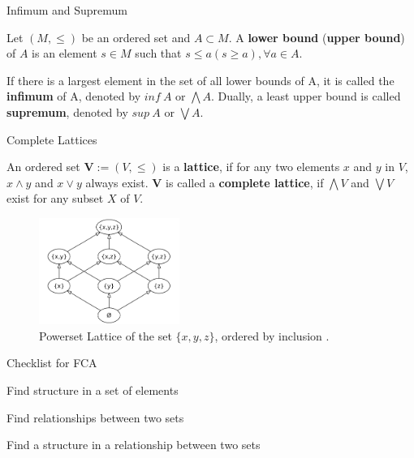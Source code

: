 \documentclass[pdf,xcolor=table]{beamer}
\newcommand{\cmark}{\ding{51}}%
\newcommand{\done}{\rlap{$\square$}{\raisebox{2pt}{\large\hspace{1pt}\cmark}}%
\hspace{-2.5pt}}
\begin{document}
\begin{frame}[t]{Infimum and Supremum}
    \begin{definition}
        Let $(M, \leq)$ be an ordered set and $A \subset M$. A \textbf{lower bound} (\textbf{upper bound}) of $A$ is an element $s \in M$ such that $s \leq a (s \geq a), \forall a \in A$.
    \end{definition}
    \begin{definition}
        If there is a largest element in the set of all lower bounds of A, it is called the \textbf{infimum} of A, denoted by $inf\ A$ or $\bigwedge A$. Dually, a least upper bound is called \textbf{supremum}, denoted by $sup\ A$ or $\bigvee A$.
    \end{definition}
\end{frame}

\begin{frame}[t]{Complete Lattices}
    \begin{definition}
        An ordered set $\textbf{V} := (V, \leq)$ is a \textbf{lattice}, if for any two elements $x$ and $y$ in $V$, $x \wedge y$ and $x \vee y$ always exist.
        \textbf{V} is called a \textbf{complete lattice}, if $\bigwedge V$ and $\bigvee V$ exist for any subset $X$ of $V$.
    \end{definition}
    \begin{figure}
        \centering
        \includegraphics[width=130pt]{Hasse_diagram_of_powerset_of_3.png}
        \caption{Powerset Lattice of the set $\{x, y, z\}$, ordered by inclusion \parencite{lattice}.}
    \end{figure}
\end{frame}

\begin{frame}[t]{Checklist for FCA}
    \begin{todolist}
        \item[\done] Find structure in a set of elements
        \item Find relationships between two sets
        \item Find a structure in a relationship between two sets
    \end{todolist}
\end{frame}
\end{document}
